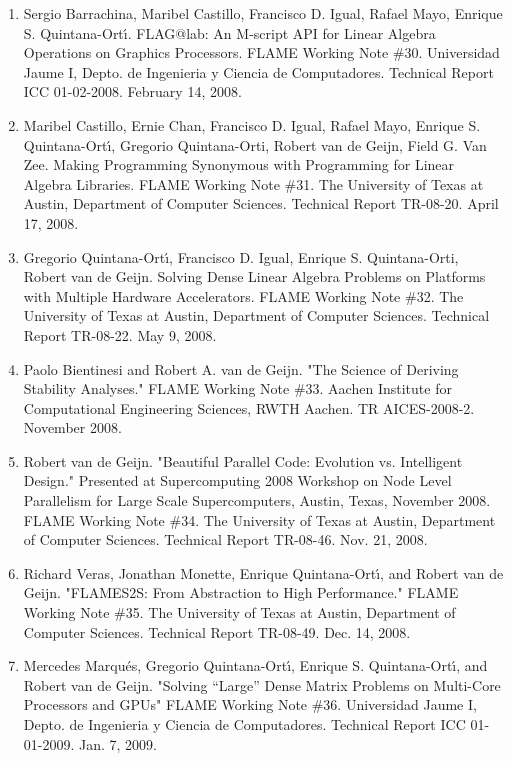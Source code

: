 \begin{enumerate}
\item
      Sergio Barrachina, Maribel Castillo, Francisco D. Igual, Rafael Mayo, Enrique S. Quintana-Ort\'{\i}. FLAG@lab: An M-script API for Linear Algebra Operations on Graphics Processors. FLAME Working Note \#30. Universidad Jaume I, Depto. de Ingenieria y Ciencia de Computadores. Technical Report ICC 01-02-2008. February 14, 2008.

\item
      Maribel Castillo, Ernie Chan, Francisco D. Igual, Rafael Mayo, Enrique S. Quintana-Ort\'{\i}, Gregorio Quintana-Orti, Robert van de Geijn, Field G. Van Zee. Making Programming Synonymous with Programming for Linear Algebra Libraries. FLAME Working Note \#31. The University of Texas at Austin, Department of Computer Sciences. Technical Report TR-08-20. April 17, 2008.

\item
      Gregorio Quintana-Ort\'{\i}, Francisco D. Igual, Enrique S. Quintana-Orti, Robert van de Geijn. Solving Dense Linear Algebra Problems on Platforms with Multiple Hardware Accelerators. FLAME Working Note \#32. The University of Texas at Austin, Department of Computer Sciences. Technical Report TR-08-22. May 9, 2008.

\item
      Paolo Bientinesi and Robert A. van de Geijn. "The Science of Deriving Stability Analyses." FLAME Working Note \#33. Aachen Institute for Computational Engineering Sciences, RWTH Aachen. TR AICES-2008-2. November 2008. 

\item
      Robert van de Geijn. "Beautiful Parallel Code: Evolution vs. Intelligent Design." Presented at Supercomputing 2008 Workshop on Node Level Parallelism for Large Scale Supercomputers, Austin, Texas, November 2008. FLAME Working Note \#34. The University of Texas at Austin, Department of Computer Sciences. Technical Report TR-08-46. Nov. 21, 2008.

\item
      Richard Veras, Jonathan Monette, Enrique Quintana-Ort\'{\i}, and Robert van de Geijn. "FLAMES2S: From Abstraction to High Performance." FLAME Working Note \#35. The University of Texas at Austin, Department of Computer Sciences. Technical Report TR-08-49. Dec. 14, 2008. 

\item
      Mercedes Marqu\'es, Gregorio Quintana-Ort\'{\i}, Enrique S. Quintana-Ort\'{\i}, and Robert van de Geijn. "Solving ``Large'' Dense Matrix Problems on Multi-Core Processors and GPUs" FLAME Working Note \#36. Universidad Jaume I, Depto. de Ingenieria y Ciencia de Computadores. Technical Report ICC 01-01-2009. Jan. 7, 2009. 


\end{enumerate}
